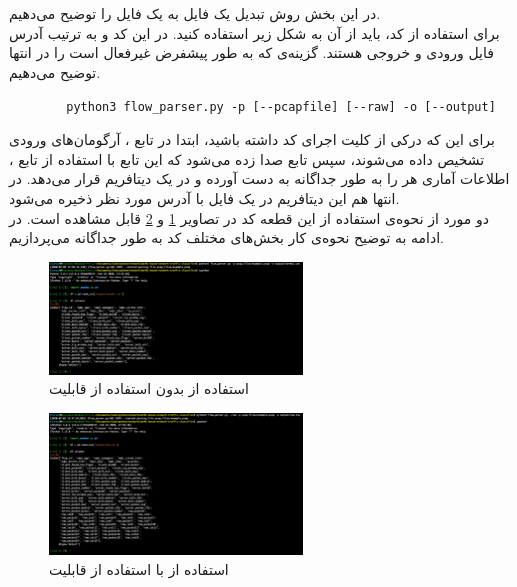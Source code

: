 \section{}
در این بخش روش تبدیل یک فایل
به یک فایل
را توضیح می‌دهیم.\\
برای استفاده از کد، باید از آن به شکل زیر استفاده کنید. 
در این کد
و
به ترتیب آدرس فایل ورودی و خروجی هستند.
گزینه‌ی  که به طور پیشفرض غیرفعال است را در انتها توضیح می‌دهیم. 
\begin{latin}
	\begin{verbatim}
		python3 flow_parser.py -p [--pcapfile] [--raw] -o [--output]	
	\end{verbatim}
\end{latin}
برای این که درکی از کلیت اجرای کد داشته باشید، ابتدا در تابع ، آرگومان‌های ورودی تشخیص داده می‌شوند، سپس تابع  صدا زده می‌شود که این تابع با استفاده از تابع ، اطلاعات  آماری هر  را به طور جداگانه به دست آورده و در یک دیتافریم  قرار می‌دهد. در انتها هم این دیتافریم در یک فایل  با آدرس مورد نظر ذخیره می‌شود.\\
دو مورد از نحوه‌ی استفاده از این قطعه کد در تصاویر 
\ref{fig:flowparser:normal}
و
\ref{fig:flowparser:raw}
قابل مشاهده است.
در ادامه به توضیح نحوه‌ی کار بخش‌های مختلف کد به طور جداگانه می‌پردازیم.
\begin{figure}[h]
	\centering
	\includegraphics[width=0.6\textwidth]{data-extraction/normal}
	\caption{استفاده‌ از  بدون استفاده از قابلیت }
	\label{fig:flowparser:normal}
\end{figure}
\begin{figure}[h]
	\centering
	\includegraphics[width=0.6\textwidth]{data-extraction/raw}
	\caption{استفاده‌ از  با استفاده از قابلیت }
	\label{fig:flowparser:raw}
\end{figure}
